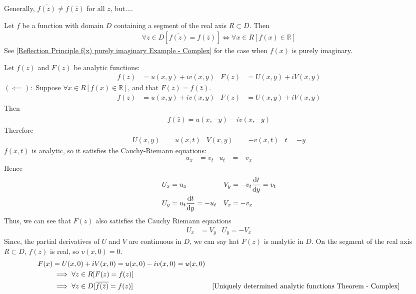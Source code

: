 \documentclass[12pt, english]{book}
\makeatletter
\renewenvironment{proof}[1][\proofname]{\par
	\pushQED{\qed}%
	\normalfont \topsep6\p@\@plus6\p@\relax
	\list{}{%
		\settowidth{\leftmargin}{\itshape\proofname:\hskip\labelsep}%
		\setlength{\labelwidth}{0pt}%
		\setlength{\itemindent}{-\leftmargin}%
	}%
	\item[\hskip\labelsep\itshape#1\@addpunct{:}]\ignorespaces
	}{ \popQED\endlist\@endpefalse}
\makeatother
\begin{document}
	Generally, \(\overline{f(z)} \neq f(\bar{z})\) for all \(z\), but....
	
	\begin{theorem}
		\label{Reflection Principle Theorem - Complex}
		Let \(f\) be a function with domain \(D\) containing a segment of the real axis \(R \subset D\). Then 
		\begin{align*}
			\forall z \in D[ \overline{f(z)} = f(\bar{z}) ]
			\iff
			\forall x \in R [f(x) \in \mathbb{R}]
		\end{align*}
		See \cref{Reflection Principle f(x) purely imaginary Example - Complex} for the case when \(f(x)\) is purely imaginary.
	\end{theorem}
	\begin{proof} 
		Let \(f(z)\) and \(F(z)\) be analytic functions: 
		\begin{align*}
			f(z) &= u(x,y) + iv(x,y) & F(z) &= U(x,y) + iV(x,y)
		\end{align*}
		\underline{\((\impliedby):\)} \newline
		Suppose \(\forall x \in R[f(x) \in \mathbb{R}]\), and that \(F(z) = \overline{f(\bar{z})}\).
		\begin{align*}
			f(z) &= u(x,y) + iv(x,y) & F(z) &= U(x,y) + iV(x,y)
		\end{align*}
		Then
		\begin{align*}
			\overline{f(\bar{z})} = u(x, -y) - iv(x,-y)
		\end{align*}
		Therefore
		\begin{align*}
			U(x,y) &= u(x,t) & V(x,y) &= -v(x,t) & t = -y
		\end{align*}
		\(f(x,t)\) is analytic, so it satisfies the Cauchy-Riemann equations:
		\begin{align*}
			u_x &= v_t & u_t &= -v_x
		\end{align*}
		Hence 
		\begin{align*}
			U_x &= u_x & V_y &= -v_t \dv{t}{y} = v_t \\
			U_y &= u_t \dv{t}{y} = -u_t & V_x &= -v_x
		\end{align*}
		Thus, we can see that \(F(z)\) also satisfies the Cauchy Riemann equations 
		\begin{align*}
			U_x &= V_y  & U_y = -V_x
		\end{align*}
		Since, the partial derivatives of \(U\) and \(V\) are continuous in \(D\), we can say hat \(F(z)\) is analytic in \(D\). On the segment of the real axis \(R \subset D\), \(f(z)\) is real, so \(v(x,0) = 0\). 
		\begin{align*}
			F(x) &= U(x, 0) + iV(x,0) = u(x,0) - iv(x, 0) = u(x, 0)\\
			&\implies \forall z \in R[F(z) = f(z) ]\\
			&\implies \forall z \in D [\overline{f(\bar{z})} = f(z)] 
				& \Cref{Uniquely determined analytic functions Theorem - Complex}
		\end{align*}
		

\end{proof}
\end{document}
